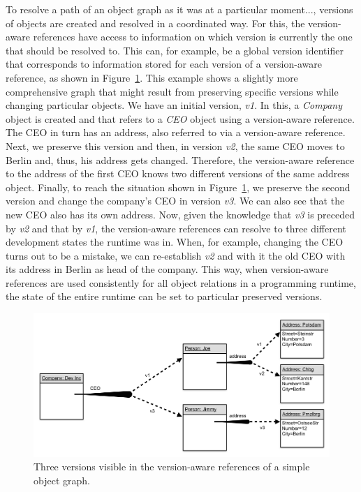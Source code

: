 To resolve a path of an object graph as it was at a particular moment..., versions of objects are created and resolved in a coordinated way.
For this, the version-aware references have access to information on which version is currently the one that should be resolved to.
This can, for example, be a global version identifier that corresponds to information stored for each version of a version-aware reference, as shown in Figure~\ref{fig:MoreVersionAwareReferences}.
This example shows a slightly more comprehensive graph that might result from preserving specific versions while changing particular objects.
We have an initial version, \emph{v1}.
In this, a \emph{Company} object is created and that refers to a \emph{CEO} object using a version-aware reference.
The CEO in turn has an address, also referred to via a version-aware reference.
Next, we preserve this version and then, in version \emph{v2}, the same CEO moves to Berlin and, thus, his address gets changed.
Therefore, the version-aware reference to the address of the first CEO knows two different versions of the same address object.
Finally, to reach the situation shown in Figure~\ref{fig:MoreVersionAwareReferences}, we preserve the second version and change the company's CEO in version \emph{v3}.
We can also see that the new CEO also has its own address.
Now, given the knowledge that \emph{v3} is preceded by \emph{v2} and that by \emph{v1}, the version-aware references can resolve to three different development states the runtime was in.
When, for example, changing the CEO turns out to be a mistake, we can re-establish \emph{v2} and with it the old CEO with its address in Berlin as head of the company.
This way, when version-aware references are used consistently for all object relations in a programming runtime, the state of the entire runtime can be set to particular preserved versions.

\begin{figure}[h]
    \centering
    \includegraphics[width=\textwidth]{figures/4_approach/multipleVersionAwareReferences.png}
    \caption{Three versions visible in the version-aware references of a simple object graph.}
    \label{fig:MoreVersionAwareReferences}
\end{figure}

